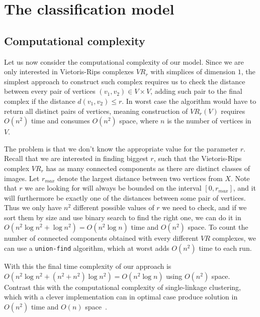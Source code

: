 \documentclass{article}
\newcommand{\enterProblemHeader}[1]{
}
\newcommand{\exitProblemHeader}[1]{
}
\newcounter{homeworkProblemCounter} %
\newcommand{\homeworkProblemName}{}
\newenvironment{homeworkProblem}[1][Problem \arabic{homeworkProblemCounter}]{ %
\stepcounter{homeworkProblemCounter} %
\renewcommand{\homeworkProblemName}{#1} %
\section{\homeworkProblemName} %
\enterProblemHeader{\homeworkProblemName} %
}{
\exitProblemHeader{\homeworkProblemName} %
}
\newcommand{\homeworkSectionName}{}
\newenvironment{homeworkSection}[1]{ %
\renewcommand{\homeworkSectionName}{#1} %
\subsection{\homeworkSectionName} %
\enterProblemHeader{\homeworkProblemName\ [\homeworkSectionName]} %
}{
\enterProblemHeader{\homeworkProblemName} %
}
\begin{document}
\begin{homeworkProblem}[The classification model]
\begin{homeworkSection}{Computational complexity}
  Let us now consider the computational complexity of our model. Since we are only interested in Vietoris-Rips complexes $VR_r$ with simplices of dimension $1$, the simplest approach to construct such complex requires us to check the distance between every pair of vertices $(v_1, v_2) \in V \times V$, adding such pair to the final complex if the distance $d(v_1, v_2) \le r$. In worst case the algorithm would have to return all distinct pairs of vertices, meaning construction of $VR_r(V)$ requires $O(n^2)$ time and consumes $O(n^2)$ space, where $n$ is the number of vertices in $V$.

  The problem is that we don't know the appropriate value for the parameter $r$. Recall that we are interested in finding biggest $r$, such that the Vietoris-Rips complex $VR_{r}$ has as many connected components as there are distinct classes of images. Let $r_{max}$ denote the largest distance between two vertices from $X$. Note that $r$ we are looking for will always be bounded on the interval $[0, r_{max}]$, and it will furthermore be exactly one of the distances between some pair of vertices. Thus we only have $n^2$ different possible values of $r$ we need to check, and if we sort them by size and use binary search to find the right one, we can do it in $O(n^2 \log n^2 + \log n^2) = O(n^2 \log n)$ time and $O(n^2)$ space. To count the number of connected components obtained with every different $VR$ complexes, we can use a \texttt{union-find} algorithm, which at worst adds $O(n^2)$ time to each run.

  With this the final time complexity of our approach is $O(n^2 \log n^2 + (n^2 + n^2)\log n^2) = O(n^2 \log n)$ using $O(n^2)$ space. Contrast this with the computational complexity of single-linkage clustering, which with a clever implementation can in optimal case produce solution in $O(n^2)$ time and $O(n)$ space~\cite{gower1969minimum}.

\end{homeworkSection}




\end{homeworkProblem}
\end{document}
